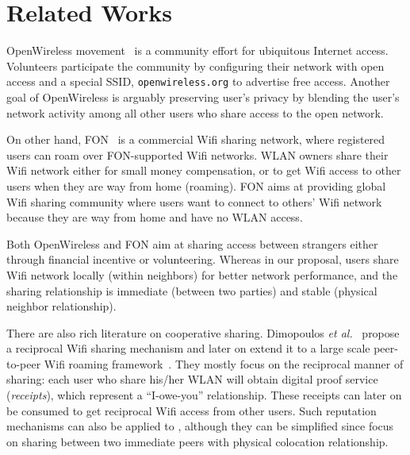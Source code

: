 \section{Related Works}
\label{sec:related}

OpenWireless movement~\cite{openwireless} is a community effort for ubiquitous
Internet access. Volunteers participate the community by configuring their
\wifi{} network with open access and a special SSID, \texttt{openwireless.org}
to advertise free access. Another goal of OpenWireless is arguably preserving user's
privacy by blending the user's network activity among all other users who share
access to the open \wifi{} network.

On other hand, FON~\cite{fon} is a commercial Wifi sharing network, where
registered users can roam over FON-supported Wifi networks. WLAN owners share
their Wifi network either for small money compensation, or to get Wifi access to
other users when they are way from home (roaming). FON aims at providing global
Wifi sharing community where users want to connect to others' Wifi network
because they are way from home and have no WLAN access. 

Both OpenWireless and FON aim at sharing \wifi{} access between strangers either
through financial incentive or volunteering. Whereas in our proposal, users share
Wifi network locally (within neighbors) for better network performance, and the
sharing relationship is immediate (between two parties) and stable (physical
neighbor relationship).

There are also rich literature on cooperative \wifi{} sharing. Dimopoulos
\textit{et al.}~\cite{efstathiou2010controlled} propose a reciprocal Wifi
sharing mechanism and later on extend it to a large scale peer-to-peer Wifi
roaming framework~\cite{dimopoulos2010exploiting}. They mostly focus on the
reciprocal manner of sharing: each user who share his/her WLAN will obtain
digital proof service (\textit{receipts}), which represent a ``I-owe-you''
relationship. These receipts can later on be consumed to get reciprocal Wifi
access from other users. Such reputation mechanisms can also be applied to
\wisefi{}, although they can be simplified since \wisefi{} focus on sharing
between two immediate peers with physical colocation relationship.
